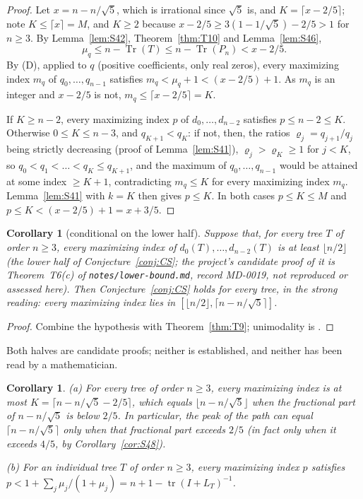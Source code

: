 \documentclass[11pt]{amsart}
\newtheorem{corollary}[theorem]{Corollary}
\theoremstyle{definition}
\theoremstyle{remark}
\newcommand{\tr}{\operatorname{tr}}
\newcommand{\Tr}{\operatorname{Tr}}
\begin{document}
\begin{proof}
Let $x=n-n/\sqrt5$, which is irrational since $\sqrt5$ is, and
$K=\lceil x-2/5\rceil$; note $K\le\lceil x\rceil=M$, and $K\ge2$ because
$x-2/5\ge3(1-1/\sqrt5)-2/5>1$ for $n\ge3$. By Lemma~\ref{lem:S42},
Theorem~\ref{thm:T10} and Lemma~\ref{lem:S46},
\[
\mu_q\le n-\Tr(T)\le n-\Tr(P_n)<x-2/5 .
\]
By (D), applied to $q$ (positive coefficients, only real zeros), every
maximizing index $m_q$ of $q_0,\dots,q_{n-1}$ satisfies
$m_q<\mu_q+1<(x-2/5)+1$. As $m_q$ is an integer and $x-2/5$ is not,
$m_q\le\lceil x-2/5\rceil=K$.

If $K\ge n-2$, every maximizing index $p$ of $d_0,\dots,d_{n-2}$ satisfies
$p\le n-2\le K$. Otherwise $0\le K\le n-3$, and $q_{K+1}<q_K$: if not, then,
the ratios $\varrho_j=q_{j+1}/q_j$ being strictly decreasing (proof of
Lemma~\ref{lem:S41}), $\varrho_j>\varrho_K\ge1$ for $j<K$, so
$q_0<q_1<\dots<q_K\le q_{K+1}$, and the maximum of $q_0,\dots,q_{n-1}$ would
be attained at some index $\ge K+1$, contradicting $m_q\le K$ for every
maximizing index $m_q$. Lemma~\ref{lem:S41} with $k=K$ then gives $p\le K$.
In both cases $p\le K\le M$ and $p\le K<(x-2/5)+1=x+3/5$.
\end{proof}

\begin{corollary}[conditional on the lower half]\label{cor:both}
Suppose that, for every tree $T$ of order $n\ge3$, every maximizing index of
$d_0(T),\dots,d_{n-2}(T)$ is at least $\lfloor n/2\rfloor$ (the lower half
of Conjecture~\ref{conj:CS}; the project's candidate proof of it is
Theorem~T6(c) of \nolinkurl{notes/lower-bound.md}, record MD-0019, not
reproduced or assessed here). Then Conjecture~\ref{conj:CS} holds for every
tree, in the strong reading: every maximizing index lies in
$[\lfloor n/2\rfloor,\lceil n-n/\sqrt5\rceil]$.
\end{corollary}

\begin{proof}
Combine the hypothesis with Theorem~\ref{thm:T9}; unimodality is
\cite[Theorem~2.1]{AAB}.
\end{proof}

Both halves are candidate proofs; neither is established, and neither has
been read by a mathematician.

\begin{corollary}\label{cor:sharper}
(a) For every tree of order $n\ge3$, every maximizing index is at most
$K=\lceil n-n/\sqrt5-2/5\rceil$, which equals $\lfloor n-n/\sqrt5\rfloor$
when the fractional part of $n-n/\sqrt5$ is below $2/5$. In particular, the
peak of the path can equal $\lceil n-n/\sqrt5\rceil$ only when that
fractional part exceeds $2/5$ (in fact only when it exceeds $4/5$, by
Corollary~\ref{cor:S48}).

(b) For an individual tree $T$ of order $n\ge3$, every maximizing index $p$
satisfies $p<1+\sum_j\mu_j/(1+\mu_j)=n+1-\tr(I+L_T)^{-1}$.
\end{corollary}
\end{document}
